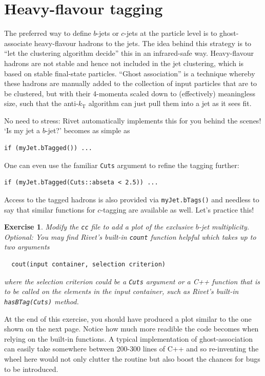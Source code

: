 \documentclass[10pt,fleqn]{scrartcl}
\theoremstyle{exstyle}
\newtheorem{exercise}{Exercise}
\begin{document}
\section{Heavy-flavour tagging}

The preferred way to define $b$-jets or $c$-jets at the particle level 
is to ghost-associate heavy-flavour hadrons to the jets.
The idea behind this strategy is to ``let the clustering algorithm decide''
this in an infrared-safe way.
Heavy-flavour hadrons are not stable and hence not included in the jet clustering,
which is based on stable final-state particles.
``Ghost association'' is a technique whereby these hadrons are manually added to the collection of
input particles that are to be clustered, but with their 4-momenta scaled down to (effectively) meaningless size,
such that the anti-$k_\text{T}$ algorithm can just pull them into a jet as it sees fit.

No need to stress: Rivet automatically implements this for you behind the scenes!
`Is my jet a $b$-jet?' becomes as simple as
\begin{verbatim}
if (myJet.bTagged()) ...
\end{verbatim}
One can even use the familiar \verb|Cuts| argument to refine the tagging further:
\begin{verbatim}
if (myJet.bTagged(Cuts::abseta < 2.5)) ...
\end{verbatim}
Access to the tagged hadrons is also provided via \verb|myJet.bTags()| and
needless to say that similar functions for $c$-tagging are available as well.
Let's practice this!

\begin{exercise}
Modify the \verb|cc| file to add a plot of the exclusive $b$-jet multiplicity.
\emph{Optional:} You may find Rivet's built-in \verb|count| function
helpful which takes up to two arguments
\begin{verbatim}
  cout(input container, selection criterion)
\end{verbatim}
where the selection criterion could be a \verb|Cuts| argument or a C++ function
that is to be called on the elements in the input container, such as
Rivet's built-in \verb|hasBTag(Cuts)| method.
\end{exercise}

At the end of this exercise, you should have produced a plot similar to
the one shown on the next page. Notice how much more readible the code
becomes when relying on the built-in functions. A typical implementation
of ghost-association can easily take somewhere between 200-300 lines of C++
and so re-inventing the wheel here would not only clutter the routine 
but also boost the chances for bugs to be introduced.
\end{document}
